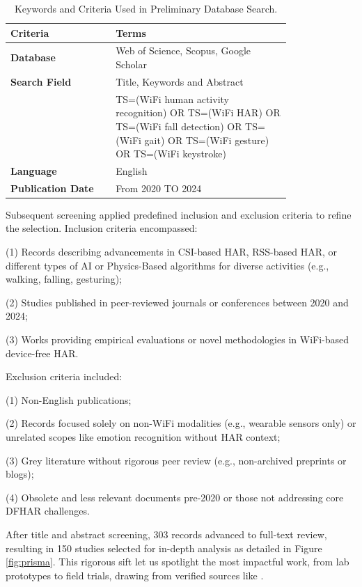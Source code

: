 \documentclass[Afour,sageh,times]{sagej}
\begin{document}
\begin{table}[ht]
\scriptsize
\caption{Keywords and Criteria Used in Preliminary Database Search.} 
\label{tab:keywords} 
\begin{tabular}{p{0.3\linewidth} p{0.5\linewidth}}
\hline
\textbf{Criteria} & \textbf{Terms} \\ \hline
\textbf{Database}  &  Web of Science, Scopus, Google Scholar \\
\textbf{Search Field} & Title, Keywords and Abstract\\
 & TS=(WiFi human activity recognition) OR TS=(WiFi HAR) OR TS=(WiFi fall detection) OR TS=(WiFi gait) OR TS=(WiFi gesture) OR TS=(WiFi keystroke) \\
\textbf{Language} & English \\
\textbf{Publication Date} & From 2020 TO 2024 \\ \hline 
\end{tabular}
\end{table}

Subsequent screening applied predefined inclusion and exclusion criteria to refine the selection. Inclusion criteria encompassed:

(1) Records describing advancements in CSI-based HAR, RSS-based HAR, or different types of AI or Physics-Based algorithms for diverse activities (e.g., walking, falling, gesturing);

(2) Studies published in peer-reviewed journals or conferences between 2020 and 2024;

(3) Works providing empirical evaluations or novel methodologies in WiFi-based device-free HAR.

Exclusion criteria included:

(1) Non-English publications;

(2) Records focused solely on non-WiFi modalities (e.g., wearable sensors only) or unrelated scopes like emotion recognition without HAR context;

(3) Grey literature without rigorous peer review (e.g., non-archived preprints or blogs);

(4) Obsolete and less relevant documents pre-2020 or those not addressing core DFHAR challenges.

After title and abstract screening, 303 records advanced to full-text review, resulting in 150 studies selected for in-depth analysis as detailed in Figure \ref{fig:prisma}. This rigorous sift let us spotlight the most impactful work, from lab prototypes to field trials, drawing from verified sources like \citep{yang2022deep, zhuravchak2022human, zhou2022target, guo2019robust, shen2022graph, zeng2021review}.
\end{document}
